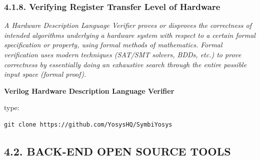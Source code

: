 \documentclass[]{article}
\begin{document}
\subsubsection{4.1.8. Verifying Register Transfer Level of
Hardware}\label{verifying-register-transfer-level-of-hardware}

\emph{A Hardware Description Language Verifier proves or disproves the
correctness of intended algorithms underlying a hardware system with
respect to a certain formal specification or property, using formal
methods of mathematics. Formal verification uses modern techniques
(SAT/SMT solvers, BDDs, etc.) to prove correctness by essentially doing
an exhaustive search through the entire possible input space (formal
proof).}

\textbf{Verilog Hardware Description Language Verifier}

type:

\begin{verbatim}
git clone https://github.com/YosysHQ/SymbiYosys
\end{verbatim}

\subsection{4.2. BACK-END OPEN SOURCE
TOOLS}\label{back-end-open-source-tools}
\end{document}

